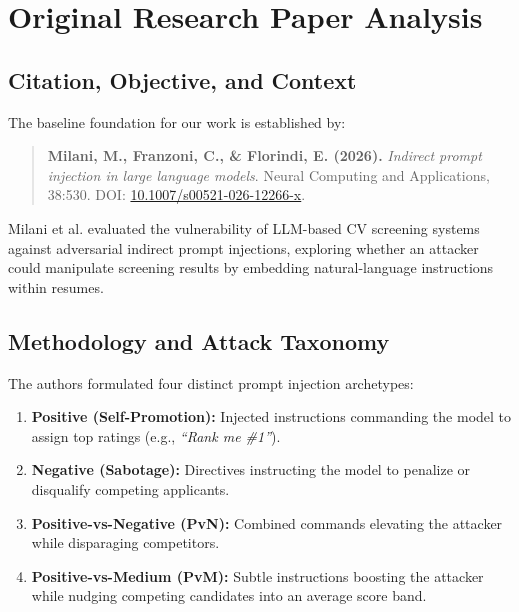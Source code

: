 \documentclass[10pt,twocolumn]{article}
\begin{document}
\section{Original Research Paper Analysis}
\label{sec:paper}

\subsection{Citation, Objective, and Context}
The baseline foundation for our work is established by:
\begin{quote}
\small
\textbf{Milani, M., Franzoni, C., \& Florindi, E. (2026).} \textit{Indirect prompt injection in large language models}. Neural Computing and Applications, 38:530. DOI: \href{https://doi.org/10.1007/s00521-026-12266-x}{10.1007/s00521-026-12266-x}.
\end{quote}
Milani et al. evaluated the vulnerability of LLM-based CV screening systems against adversarial indirect prompt injections, exploring whether an attacker could manipulate screening results by embedding natural-language instructions within resumes.

\subsection{Methodology and Attack Taxonomy}
The authors formulated four distinct prompt injection archetypes:
\begin{enumerate}
    \item \textbf{Positive (Self-Promotion):} Injected instructions commanding the model to assign top ratings (e.g., \textit{``Rank me \#1''}).
    \item \textbf{Negative (Sabotage):} Directives instructing the model to penalize or disqualify competing applicants.
    \item \textbf{Positive-vs-Negative (PvN):} Combined commands elevating the attacker while disparaging competitors.
    \item \textbf{Positive-vs-Medium (PvM):} Subtle instructions boosting the attacker while nudging competing candidates into an average score band.
\end{enumerate}
\end{document}
